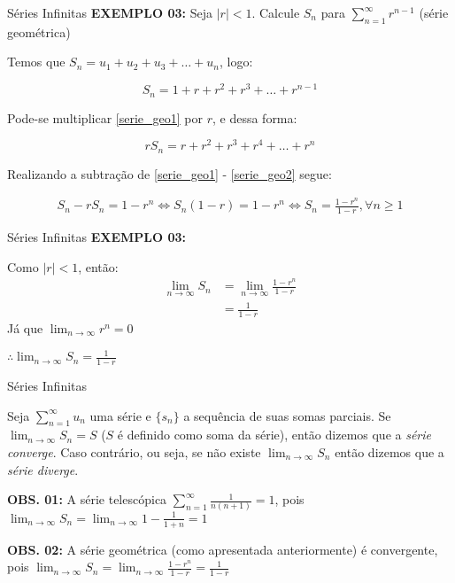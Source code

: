\documentclass[hyperref={pdfpagelabels=false}]{beamer}
\begin{document}
\begin{frame}{Séries Infinitas}
 {\bf EXEMPLO 03:}
 Seja $|r|<1$. Calcule $S_n$ para $\displaystyle \sum_{n=1}^{\infty}r^{n-1}$ (série geométrica)
 \pause
 
 Temos que $S_n = u_1 + u_2 + u_3 + \dots + u_n$, logo: 
 
 \begin{equation}
 \label{serie_geo1}
  S_n = 1 + r + r^2 + r^3 + \dots + r^{n-1}
 \end{equation}

 Pode-se multiplicar \ref{serie_geo1} por $r$, e dessa forma:
 
 \begin{equation}
  \label{serie_geo2}
  rS_n = r + r^2 + r^3 + r^4 + \dots + r^n
 \end{equation}

 Realizando a subtração de \ref{serie_geo1} - \ref{serie_geo2} segue:
 
 \begin{align*}
  S_n - rS_n = 1 - r^n \iff S_n(1-r) = 1 - r^n \iff S_n = \frac{1-r^n}{1-r},\forall n \geq 1
 \end{align*}

\end{frame}

\begin{frame}{Séries Infinitas}
 {\bf EXEMPLO 03:}

 Como $|r|<1$, então:
 \begin{align*}
  \lim_{n\to \infty} S_n &= \lim_{n \to \infty} \frac{1-r^n}{1-r}\\
  &= \frac{1}{1-r}
 \end{align*}
Já que $\displaystyle \lim_{n\to \infty} r^n = 0$

$\therefore \displaystyle \lim_{n\to \infty} S_n = \frac{1}{1-r}$
 
\end{frame}

\begin{frame}{Séries Infinitas}
 \begin{definition}
  Seja $\displaystyle \sum_{n=1}^{\infty}u_n$ uma série e $\{s_n\}$ a sequência de suas somas parciais. Se $\displaystyle \lim_{n\to \infty}S_n = S$ ($S$ é definido como soma da série), então dizemos que a \emph{série converge}. Caso contrário, ou seja, se não existe $\displaystyle \lim_{n\to\infty}S_n$ então dizemos que a \emph{série diverge}.
 \end{definition} \pause
 
 {\bf OBS. 01:} A série telescópica $\displaystyle \sum_{n=1}^{\infty}\frac{1}{n(n+1)} = 1$, pois $\displaystyle \lim_{n\to \infty}S_n = \lim_{n \to \infty} 1-\frac{1}{1+n} = 1$
 
 {\bf OBS. 02:} A série geométrica (como apresentada anteriormente) é convergente, pois $\displaystyle \lim_{n\to \infty}S_n = \lim_{n \to \infty} \frac{1-r^n}{1-r} = \frac{1}{1-r}$ 

\end{frame}
\end{document}
